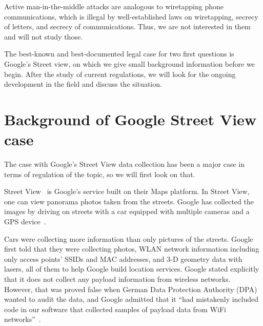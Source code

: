 \documentclass[12pt,a4paper,oneside,pdftex]{report}
\begin{document}
Active man-in-the-middle attacks are analogous to wiretapping phone communications, which is illegal by well-established laws on wiretapping, secrecy of letters, and secrecy of communications. Thus, we are not interested in them and will not study those.

The best-known and best-documented legal case for two first questions is Google's Street view, on which we give small background information before we begin. After the study of current regulations, we will look for the ongoing development in the field and discuss the situation.



\section{Background of Google Street View case}
\label{sec:streetview}

The case with Google's Street View data collection has been a major case in terms of regulation of the topic, so we will first look on that. 

Street View~\cite{googlestreetview} is Google's service built on their Maps platform. In Street View, one can view panorama photos taken from the streets. Google has collected the images by driving on streets with a car equipped with multiple cameras and a GPS device~\cite{streetview_behindscenes}.

Cars were collecting more information than only pictures of the streets. Google first told that they were collecting photos, WLAN network information including only access points' SSIDs and MAC addresses, and 3-D geometry data with lasers, all of them to help Google build location services. Google stated explicitly that it does not collect any payload information from wireless networks.~\cite{fleischer_datacollected,google_wifi_collection} However, that was proved false when German Data Protection Authority (DPA) wanted to audit the data, and Google admitted that it ``had mistakenly included code in our software that collected samples of payload data from WiFi networks''~\cite{eustace_datacollected}.
\end{document}
